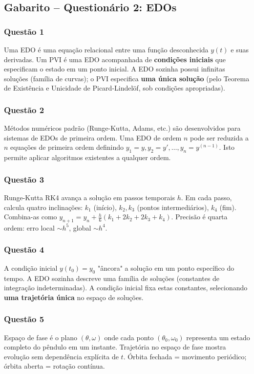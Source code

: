 \documentclass[12pt,a4paper]{article}
\begin{document}
\subsection{Gabarito -- Questionário 2: EDOs}

\subsubsection{Questão 1}
Uma EDO é uma equação relacional entre uma função desconhecida $y(t)$ e suas derivadas. Um PVI é uma EDO acompanhada de \textbf{condições iniciais} que especificam o estado em um ponto inicial. A EDO sozinha possui infinitas soluções (família de curvas); o PVI especifica \textbf{uma única solução} (pelo Teorema de Existência e Unicidade de Picard-Lindelöf, sob condições apropriadas).

\subsubsection{Questão 2}
Métodos numéricos padrão (Runge-Kutta, Adams, etc.) são desenvolvidos para sistemas de EDOs de primeira ordem. Uma EDO de ordem $n$ pode ser reduzida a $n$ equações de primeira ordem definindo $y_1 = y, y_2 = y', \ldots, y_n = y^{(n-1)}$. Isto permite aplicar algoritmos existentes a qualquer ordem.

\subsubsection{Questão 3}
Runge-Kutta RK4 avança a solução em passos temporais $h$. Em cada passo, calcula quatro inclinações: $k_1$ (início), $k_2, k_3$ (pontos intermediários), $k_4$ (fim). Combina-as como $y_{n+1} = y_n + \frac{h}{6}(k_1 + 2k_2 + 2k_3 + k_4)$. Precisão é quarta ordem: erro local $\sim h^5$, global $\sim h^4$.

\subsubsection{Questão 4}
A condição inicial $y(t_0) = y_0$ "âncora" a solução em um ponto específico do tempo. A EDO sozinha descreve uma família de soluções (constantes de integração indeterminadas). A condição inicial fixa estas constantes, selecionando \textbf{uma trajetória única} no espaço de soluções.

\subsubsection{Questão 5}
Espaço de fase é o plano $(\theta, \omega)$ onde cada ponto $(θ_0, \omega_0)$ representa um estado completo do pêndulo em um instante. Trajetória no espaço de fase mostra evolução sem dependência explícita de $t$. Órbita fechada = movimento periódico; órbita aberta = rotação contínua.
\end{document}

